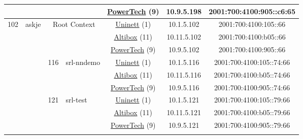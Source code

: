 \begin{small}
\begin{center}
\begin{longtable}{|c|c|c|c|c|c|c|c|}
  &  &  &  & \multicolumn{2}{|c|}{\tiny{\href{http://www.powertech.no}{PowerTech} (9)}} & \tiny{10.9.5.198} & \tiny{2001:700:4100:905::c6:65} \\ \hline
 \multirow{36}{*}{\tiny{102}} & \multicolumn{1}{|l|}{\multirow{36}{*}{\tiny{askje}}} & \multicolumn{2}{|c|}{\multirow{3}{*}{\tiny{Root Context}}} & \multicolumn{2}{|c|}{\tiny{\href{https://www.uninett.no}{Uninett} (1)}} & \tiny{10.1.5.102} & \tiny{2001:700:4100:105::66} \\* \cline{5-5}\cline{6-6}\cline{7-7}\cline{8-8}
  &  & \multicolumn{2}{|c|}{} & \multicolumn{2}{|c|}{\tiny{\href{https://www.altibox.no}{Altibox} (11)}} & \tiny{10.11.5.102} & \tiny{2001:700:4100:b05::66} \\* \cline{5-5}\cline{6-6}\cline{7-7}\cline{8-8}
  &  & \multicolumn{2}{|c|}{} & \multicolumn{2}{|c|}{\tiny{\href{http://www.powertech.no}{PowerTech} (9)}} & \tiny{10.9.5.102} & \tiny{2001:700:4100:905::66} \\* \cline{3-3}\cline{4-4}\cline{5-5}\cline{6-6}\cline{7-7}\cline{8-8}
  &  & \multirow{3}{*}{\tiny{116}} & \multicolumn{1}{|l|}{\multirow{3}{*}{\tiny{srl-nndemo}}} & \multicolumn{2}{|c|}{\tiny{\href{https://www.uninett.no}{Uninett} (1)}} & \tiny{10.1.5.116} & \tiny{2001:700:4100:105::74:66} \\* \cline{5-5}\cline{6-6}\cline{7-7}\cline{8-8}
  &  &  &  & \multicolumn{2}{|c|}{\tiny{\href{https://www.altibox.no}{Altibox} (11)}} & \tiny{10.11.5.116} & \tiny{2001:700:4100:b05::74:66} \\* \cline{5-5}\cline{6-6}\cline{7-7}\cline{8-8}
  &  &  &  & \multicolumn{2}{|c|}{\tiny{\href{http://www.powertech.no}{PowerTech} (9)}} & \tiny{10.9.5.116} & \tiny{2001:700:4100:905::74:66} \\* \cline{3-3}\cline{4-4}\cline{5-5}\cline{6-6}\cline{7-7}\cline{8-8}
  &  & \multirow{3}{*}{\tiny{121}} & \multicolumn{1}{|l|}{\multirow{3}{*}{\tiny{srl-test}}} & \multicolumn{2}{|c|}{\tiny{\href{https://www.uninett.no}{Uninett} (1)}} & \tiny{10.1.5.121} & \tiny{2001:700:4100:105::79:66} \\* \cline{5-5}\cline{6-6}\cline{7-7}\cline{8-8}
  &  &  &  & \multicolumn{2}{|c|}{\tiny{\href{https://www.altibox.no}{Altibox} (11)}} & \tiny{10.11.5.121} & \tiny{2001:700:4100:b05::79:66} \\* \cline{5-5}\cline{6-6}\cline{7-7}\cline{8-8}
  &  &  &  & \multicolumn{2}{|c|}{\tiny{\href{http://www.powertech.no}{PowerTech} (9)}} & \tiny{10.9.5.121} & \tiny{2001:700:4100:905::79:66} \\* \cline{3-3}\cline{4-4}\cline{5-5}\cline{6-6}\cline{7-7}\cline{8-8}

\end{longtable}
\end{center}
\end{small}
